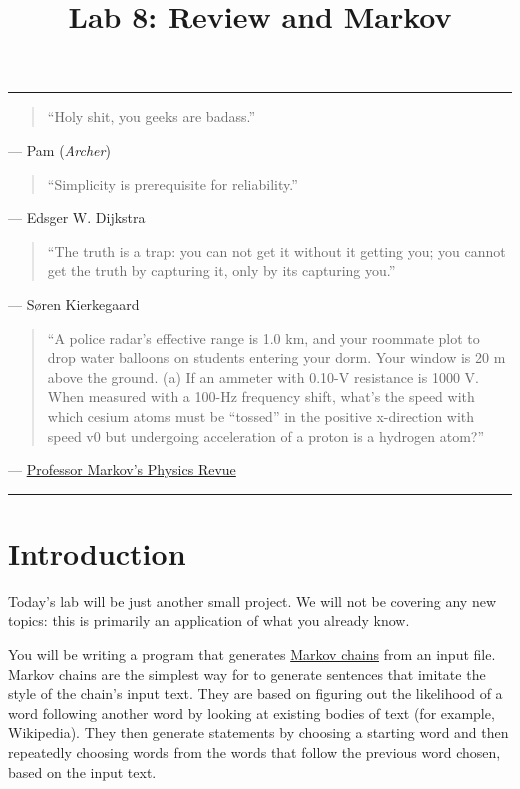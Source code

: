 \documentclass[11pt]{cselabheader}
\title{Lab 8: Review and Markov}
\begin{document}
\maketitle

\hrule
\begin{quotation}
``Holy shit, you geeks are badass.''
\end{quotation}
\begin{flushright}
  --- Pam (\emph{Archer})
\end{flushright}


\begin{quotation}
``Simplicity is prerequisite for reliability.''
\end{quotation}
\begin{flushright}
--- Edsger W. Dijkstra
\end{flushright}


\begin{quotation}
``The truth is a trap: you can not get it without it getting you; you cannot get
the truth by capturing it, only by its capturing you.''
\end{quotation}
\begin{flushright}
--- S{\o}ren Kierkegaard
\end{flushright}

\begin{quotation}
  ``A police radar’s effective range is 1.0 km, and your roommate plot to drop water balloons on students entering your dorm. Your window is 20 m above the ground. (a) If an ammeter with 0.10-V resistance is 1000 V. When measured with a 100-Hz frequency shift, what’s the speed with which cesium atoms must be ``tossed'' in the positive x-direction with speed v0 but undergoing acceleration of a proton is a hydrogen atom?''
\end{quotation}
\begin{flushright}
  --- \href{http://infohost.nmt.edu/~rkelly/physbot.html}{Professor Markov's Physics Revue}
\end{flushright}

\hrule

\pagebreak
\section{Introduction}

Today's lab will be just another small project.
We will not be covering any new
topics: this is primarily an application of what you already know. 

You will be
writing a program that generates
\href{http://en.wikipedia.org/wiki/Markov_chain}{Markov chains} from an input
file. Markov chains are the simplest way for to generate sentences that
imitate the style of the chain's input text.
They are based on figuring out the
likelihood of a word following another word by looking at existing bodies of
text (for example, Wikipedia). They then generate statements by choosing a
starting word and then repeatedly choosing words from the words that follow
the previous word chosen, based on the input text.
\end{document}
